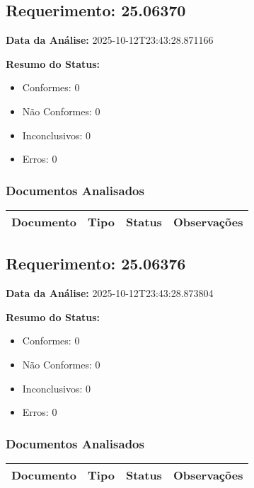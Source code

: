 \documentclass[12pt,a4paper]{article}
\begin{document}
\subsection{Requerimento: 25.06370}

\textbf{Data da Análise:} 2025-10-12T23:43:28.871166

\textbf{Resumo do Status:}
\begin{itemize}
    \item Conformes: 0
    \item Não Conformes: 0
    \item Inconclusivos: 0
    \item Erros: 0
\end{itemize}

\subsubsection{Documentos Analisados}

\begin{longtable}{|p{4cm}|p{2cm}|p{2cm}|p{6cm}|}
\hline
\textbf{Documento} & \textbf{Tipo} & \textbf{Status} & \textbf{Observações} \\
\hline
\endhead
\end{longtable}


\subsection{Requerimento: 25.06376}

\textbf{Data da Análise:} 2025-10-12T23:43:28.873804

\textbf{Resumo do Status:}
\begin{itemize}
    \item Conformes: 0
    \item Não Conformes: 0
    \item Inconclusivos: 0
    \item Erros: 0
\end{itemize}

\subsubsection{Documentos Analisados}

\begin{longtable}{|p{4cm}|p{2cm}|p{2cm}|p{6cm}|}
\hline
\textbf{Documento} & \textbf{Tipo} & \textbf{Status} & \textbf{Observações} \\
\hline
\endhead
\end{longtable}
\end{document}
